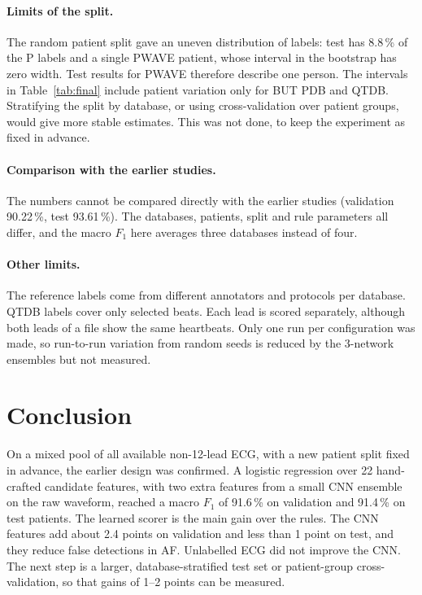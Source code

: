 \documentclass[11pt,a4paper]{article}
\begin{document}
\paragraph{Limits of the split.} The random patient split gave an uneven distribution of labels: test has 8.8\,\% of the P labels and a single PWAVE patient, whose interval in the bootstrap has zero width. Test results for PWAVE therefore describe one person. The intervals in Table~\ref{tab:final} include patient variation only for BUT PDB and QTDB. Stratifying the split by database, or using cross-validation over patient groups, would give more stable estimates. This was not done, to keep the experiment as fixed in advance.

\paragraph{Comparison with the earlier studies.} The numbers cannot be compared directly with the earlier studies (validation 90.22\,\%, test 93.61\,\%). The databases, patients, split and rule parameters all differ, and the macro $F_1$ here averages three databases instead of four.

\paragraph{Other limits.} The reference labels come from different annotators and protocols per database. QTDB labels cover only selected beats. Each lead is scored separately, although both leads of a file show the same heartbeats. Only one run per configuration was made, so run-to-run variation from random seeds is reduced by the 3-network ensembles but not measured.

\section{Conclusion}

On a mixed pool of all available non-12-lead ECG, with a new patient split fixed in advance, the earlier design was confirmed. A logistic regression over 22 hand-crafted candidate features, with two extra features from a small CNN ensemble on the raw waveform, reached a macro $F_1$ of 91.6\,\% on validation and 91.4\,\% on test patients. The learned scorer is the main gain over the rules. The CNN features add about 2.4 points on validation and less than 1 point on test, and they reduce false detections in AF. Unlabelled ECG did not improve the CNN. The next step is a larger, database-stratified test set or patient-group cross-validation, so that gains of 1--2 points can be measured.
\end{document}
